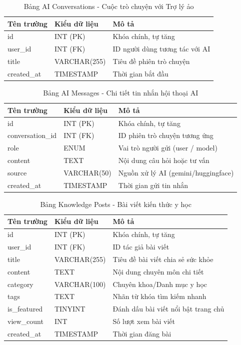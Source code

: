 \documentclass[a4paper,13pt]{extreport}
\begin{document}
\begin{table}[H]
\centering
\caption{Bảng AI Conversations - Cuộc trò chuyện với Trợ lý ảo}
\begin{tabular}{|l|l|l|}
\hline
\textbf{Tên trường} & \textbf{Kiểu dữ liệu} & \textbf{Mô tả} \\
\hline
id & INT (PK) & Khóa chính, tự tăng \\
user\_id & INT (FK) & ID người dùng tương tác với AI \\
title & VARCHAR(255) & Tiêu đề phiên trò chuyện \\
created\_at & TIMESTAMP & Thời gian bắt đầu \\
\hline
\end{tabular}
\end{table}

\begin{table}[H]
\centering
\caption{Bảng AI Messages - Chi tiết tin nhắn hội thoại AI}
\begin{tabular}{|l|l|l|}
\hline
\textbf{Tên trường} & \textbf{Kiểu dữ liệu} & \textbf{Mô tả} \\
\hline
id & INT (PK) & Khóa chính, tự tăng \\
conversation\_id & INT (FK) & ID phiên trò chuyện tương ứng \\
role & ENUM & Vai trò người gửi (user / model) \\
content & TEXT & Nội dung câu hỏi hoặc tư vấn \\
source & VARCHAR(50) & Nguồn xử lý AI (gemini/huggingface) \\
created\_at & TIMESTAMP & Thời gian gửi tin nhắn \\
\hline
\end{tabular}
\end{table}

\begin{table}[H]
\centering
\caption{Bảng Knowledge Posts - Bài viết kiến thức y học}
\begin{tabular}{|l|l|l|}
\hline
\textbf{Tên trường} & \textbf{Kiểu dữ liệu} & \textbf{Mô tả} \\
\hline
id & INT (PK) & Khóa chính, tự tăng \\
user\_id & INT (FK) & ID tác giả bài viết \\
title & VARCHAR(255) & Tiêu đề bài viết chia sẻ sức khỏe \\
content & TEXT & Nội dung chuyên môn chi tiết \\
category & VARCHAR(100) & Chuyên khoa/Danh mục y học \\
tags & TEXT & Nhãn từ khóa tìm kiếm nhanh \\
is\_featured & TINYINT & Đánh dấu bài viết nổi bật trang chủ \\
view\_count & INT & Số lượt xem bài viết \\
created\_at & TIMESTAMP & Thời gian đăng bài \\
\hline
\end{tabular}
\end{table}
\end{document}
